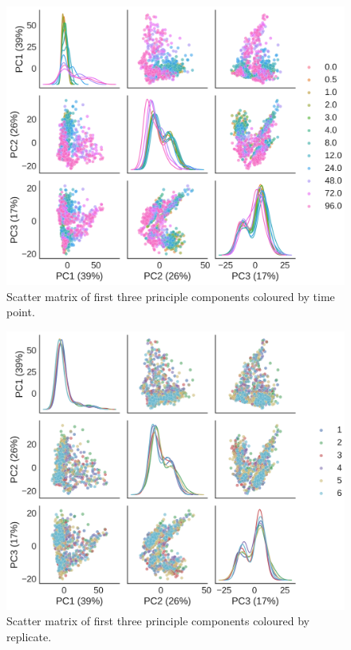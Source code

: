 \documentclass[alpha-refs]{wiley-article}
\begin{document}
\begin{figure}
	\centering
	\includegraphics[height=0.45\textheight]{img/qc/time_point}
	\caption{Scatter matrix of first three principle components coloured by time point.}
	\label{fig:qc:time_point}
\end{figure}

\begin{figure}
	\centering
	\includegraphics[height=0.45\textheight]{img/qc/replicate}
	\caption{Scatter matrix of first three principle components coloured by replicate.}
	\label{fig:qc:replicate}
\end{figure}
\end{document}
